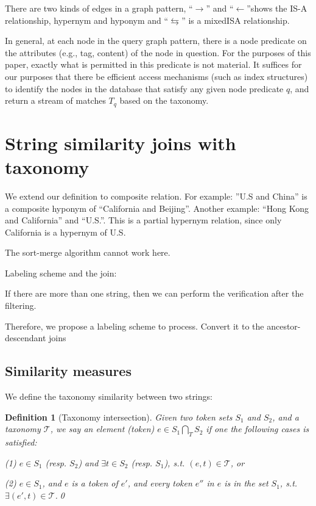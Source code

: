 \documentclass{sig-alternate}
\newtheorem{defi}[theorem]{Definition}
\newif\ifqedwritten
\newenvironment{definition}[1][]{\begin{defi}[#1]\upshape\qedwrittenfalse}{\qedhere\end{defi}}
\newcommand{\qedhere}{\ifqedwritten\else\ifmmode\tag*{\qed}\else\hfill\qed\fi\global\qedwrittentrue\fi}
\begin{document}
There are two kinds of edges in a graph pattern, ``$\rightarrow$'' and ``$\leftarrow$''shows the IS-A relationship, hypernym and hyponym and ``$\leftrightarrows$'' is a mixedISA relationship.

In general, at each node in the query graph pattern, there is
a node predicate on the attributes (e.g., tag, content) of the
node in question. For the purposes of this paper, exactly
what is permitted in this predicate is not material.  It suffices
for our purposes that there be efficient access mechanisms
(such as index structures) to identify the nodes in the
database that satisfy any given node predicate $q$, and
return a stream of matches $T_q$ based on the taxonomy.



\section{String similarity joins with taxonomy}


We extend our definition to composite relation. For example: ''U.S and China'' is a composite hyponym of ``California and Beijing''. Another example: ``Hong Kong and California'' and ``U.S.''. This is a partial hypernym relation, since only California is a hypernym of U.S.

The sort-merge algorithm cannot work here.

Labeling scheme and the join:

If there are more than one string, then we can perform the verification after the filtering.


 Therefore, we propose a labeling scheme to process. Convert it to the ancestor-descendant joins



\subsection{Similarity measures}



We define the taxonomy similarity between two strings:

\begin{definition}[Taxonomy intersection]
Given two token sets $S_1$ and $S_2$, and a taxonomy $\mathcal{T}$, we say an element (token) $e \in S_1 \bigcap_T S_2$ if one the following cases is satisfied:

(1) $ e \in S_1$ (resp. $S_2$) and $\exists t \in S_2$ (resp. $S_1$), s.t. $(e,t) \in \mathcal{T} $, or

(2) $ e \in S_1$, and $e$ is a token of $e'$, and every token $e''$ in $e$ is in the set $S_1$, s.t. $\exists (e',t) \in \mathcal{T}$.\end{definition}
\end{document}
